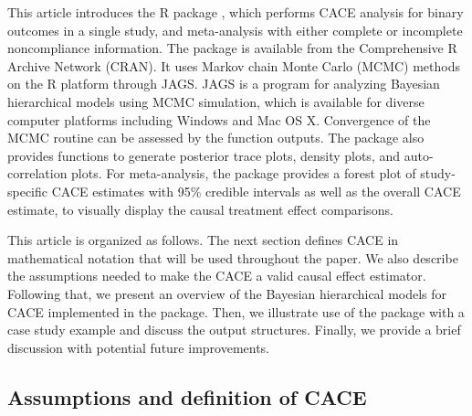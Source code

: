 This article introduces the R package , which performs CACE analysis for binary outcomes in a single study, and meta-analysis with either complete or incomplete noncompliance information.
The package  is available from the Comprehensive R Archive Network (CRAN).
It uses Markov chain Monte Carlo (MCMC) methods on the R platform through \textsf{JAGS}. \textsf{JAGS} is a program for analyzing Bayesian hierarchical models using MCMC simulation, which is available for diverse computer platforms including Windows and Mac OS X. Convergence of the MCMC routine can be assessed by the function outputs. The package also provides functions to generate posterior trace plots, density plots, and auto-correlation plots. For meta-analysis, the package provides a forest plot of study-specific CACE estimates with 95\% credible intervals as well as the overall CACE estimate, to visually display the causal treatment effect comparisons.

This article is organized as follows. The next section defines CACE in mathematical notation that will be used throughout the paper. We also describe the assumptions needed to make the CACE a valid causal effect estimator. Following that, we present an overview of the Bayesian hierarchical models for CACE implemented in the  package. Then, we illustrate use of the package with a case study example and discuss the output structures. Finally, we provide a brief discussion with potential future improvements.

\hypertarget{assumptions-and-definition-of-cace}{%
\subsection{Assumptions and definition of CACE}\label{assumptions-and-definition-of-cace}}

